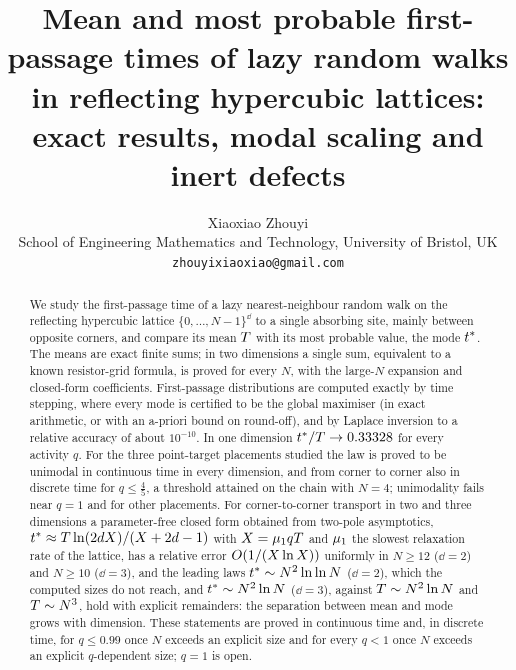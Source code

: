 \documentclass[11pt,a4paper]{article}
\title{Mean and most probable first-passage times of lazy random walks in reflecting
hypercubic lattices: exact results, modal scaling and inert defects}
\author{Xiaoxiao Zhouyi\\[2pt]
{\normalsize School of Engineering Mathematics and Technology, University of Bristol, UK}\\
{\normalsize\texttt{zhouyixiaoxiao@gmail.com}}}
\date{}
\begin{document}
\maketitle

\begin{abstract}
We study the first-passage time of a lazy nearest-neighbour random walk on the reflecting hypercubic lattice
$\{0,\dots,N-1\}^{\dd}$ to a single absorbing site, mainly between opposite corners, and compare its mean $T$ with
its most probable value, the mode $t^{*}$. The means are exact finite sums; in two dimensions a single sum, equivalent
to a known resistor-grid formula, is proved for every $N$, with the large-$N$ expansion and closed-form coefficients.
First-passage distributions are computed exactly by time stepping, where every mode is certified to be the global
maximiser (in exact arithmetic, or with an a-priori bound on round-off), and by Laplace inversion to a relative
accuracy of about $10^{-10}$.
In one dimension $t^{*}/T\to0.33328$ for every activity $q$. %
For the three point-target placements studied the law is proved to be unimodal in continuous time in every
dimension, and from corner to corner also in discrete time for $q\le\frac45$, a threshold attained on the chain with
$N=4$; unimodality fails near $q=1$ and for other placements. %
For corner-to-corner transport in two and three dimensions a parameter-free closed form obtained from two-pole
asymptotics, $t^{*}\approx T\ln(2d X)/(X+2d-1)$ with $X=\mu_{1} qT$ and $\mu_{1}$ the slowest relaxation rate of
the lattice, has a relative error $O(1/(X\ln X))$ uniformly in $N\ge12$ ($\dd=2$) and $N\ge10$ ($\dd=3$), and
the leading laws $t^{*}\sim N^{2}\ln\ln N$ ($\dd=2$), which the computed sizes do not reach, and
$t^{*}\sim N^{2}\ln N$ ($\dd=3$), against $T\sim N^{2}\ln N$ and $T\sim N^{3}$, hold with explicit remainders:
the separation between mean and mode grows with dimension. These statements are proved in continuous time and, in
discrete time, for $q\le0.99$ once $N$ exceeds an explicit size and for every $q<1$ once $N$ exceeds an
explicit $q$-dependent size; $q=1$ is open.

\end{abstract}
\end{document}
